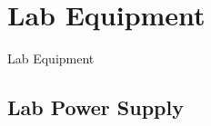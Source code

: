 \documentclass{beamer}
\begin{document}
\begin{frame}
\titlepage

\setcounter{tocdepth}{1}
\tableofcontents
\end{frame}


\section{Lab Equipment} %
\begin{frame}
\centering \huge Lab Equipment
\end{frame}

\subsection{Lab Power Supply}
\end{document}
